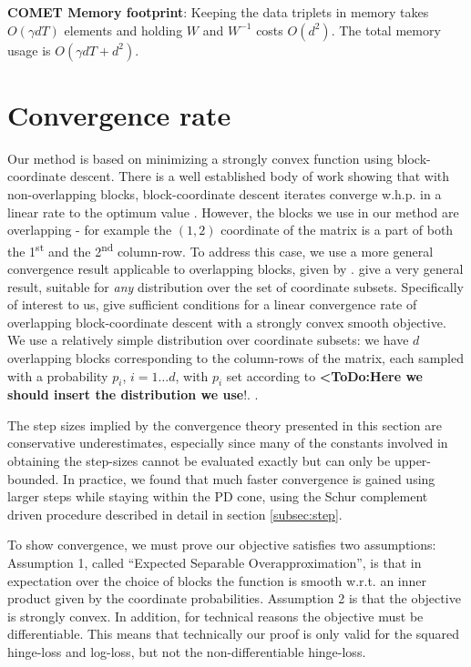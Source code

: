 \documentclass{article} %
\newcommand\todo[1]{\textbf{<ToDo:#1}!}
\newcommand\mat[1]{{#1}}
\newcommand{\W}{\mat{W}}
\begin{document}
{\bf COMET Memory footprint}: Keeping the data triplets in memory takes $O(\gamma d T)$ elements and holding $\W$ and $\W^{-1}$ costs $O(d^2)$. The total memory usage is $O(\gamma d T + d^2)$. 

\section{Convergence rate}
Our method is based on minimizing a strongly convex function using block-coordinate descent. There is a well established body of work showing that with non-overlapping blocks, block-coordinate descent iterates converge w.h.p. in a linear rate to the optimum value \cite{nesterov2012efficiency,richtarik2014iteration}.
However, the blocks we use in our method are overlapping - for example the $(1,2)$ coordinate of the matrix is a part of both the 1\textsuperscript{st} and the 2\textsuperscript{nd} column-row. To address this case, we use a more general convergence result applicable to overlapping blocks, given by \citet{richtarik2013optimal}. \citeauthor{richtarik2013optimal} give a very general result, suitable for \emph{any} distribution over the set of coordinate subsets. 
Specifically of interest to us, \citeauthor{richtarik2013optimal} give sufficient conditions for a linear convergence rate of overlapping block-coordinate descent with a strongly convex smooth objective. 
We use a relatively simple distribution over coordinate subsets: we have $d$ overlapping blocks corresponding to the column-rows of the matrix, each sampled with a probability $p_i$, $i=1 \ldots d$, with $p_i$ set according to \todo{Here we should insert the distribution we use}.
.

The step sizes implied by the convergence theory presented in this section are conservative underestimates, especially since many of the constants involved in obtaining the step-sizes cannot be evaluated exactly but can only be upper-bounded. In practice, we found that much faster convergence is gained using larger steps while staying within the PD cone, using the Schur complement driven procedure described in detail in section \ref{subsec:step}.

To show convergence, we must prove our objective satisfies two assumptions: Assumption 1, called ``Expected Separable Overapproximation'', is that in expectation over the choice of blocks the function is smooth w.r.t. an inner product given by the coordinate probabilities. Assumption 2 is that the objective is strongly convex. In addition, for technical reasons the objective must be differentiable. This means that technically our proof is only valid for the squared hinge-loss and log-loss, but not the non-differentiable hinge-loss.
\end{document}
